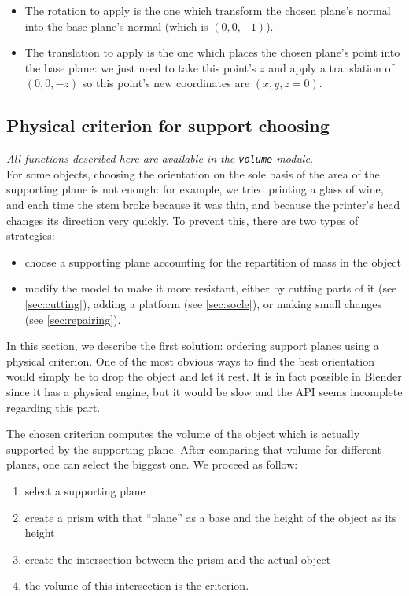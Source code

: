 \documentclass{report}
\begin{document}
\begin{itemize}
\item The rotation to apply is the one which transform the chosen plane’s normal into the base plane’s normal (which is $(0, 0, -1)$).
\item The translation to apply is the one which places the chosen plane’s point into the base plane: we just need to take this point’s $z$ and apply a translation of $(0, 0, -z)$ so this point’s new coordinates are $(x, y, z=0)$.
\end{itemize}

\subsection{Physical criterion for support choosing}

	\emph{All functions described here are available in the \texttt{volume} module.}\\

	For some objects, choosing the orientation on the sole basis of the area of the supporting plane is not enough: for example, we tried printing a glass of wine, and each time the stem broke because it was thin, and because the printer's head changes its direction very quickly. To prevent this, there are two types of strategies:
	\begin{itemize}
		\item choose a supporting plane accounting for the repartition of mass in the object
		\item modify the model to make it more resistant, either by cutting parts of it (see \ref{sec:cutting}), adding a platform (see \ref{sec:socle}), or making small changes (see \ref{sec:repairing}).
	\end{itemize}

	In this section, we describe the first solution: ordering support planes using a physical criterion. One of the most obvious ways to find the best orientation would simply be to drop the object and let it rest. It is in fact possible in Blender since it has a physical engine, but it would be slow and the API seems incomplete regarding this part.
	
	The chosen criterion computes the volume of the object which is actually supported by the supporting plane. After comparing that volume for different planes, one can select the biggest one.
	We proceed as follow:
	\begin{enumerate}
		\item select a supporting plane
		\item create a prism with that “plane” as a base and the height of the object as its height
		\item create the intersection between the prism and the actual object
		\item the volume of this intersection is the criterion.
	\end{enumerate}
\end{document}
